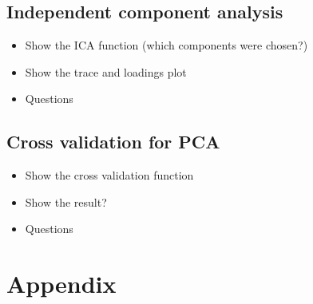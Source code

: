 \documentclass[a4paper, twocolumn]{article}
\begin{document}
    \subsection{Independent component analysis}
    \begin{itemize}
        \item Show the ICA function (which components were chosen?)
        \item Show the trace and loadings plot
        \item Questions
    \end{itemize}
    \subsection{Cross validation for PCA}
    \begin{itemize}
        \item Show the cross validation function
        \item Show the result?
        \item Questions
    \end{itemize}
    \nocite{*} %
    
    
    \onecolumn \appendix
    \section*{Appendix}
\end{document}
